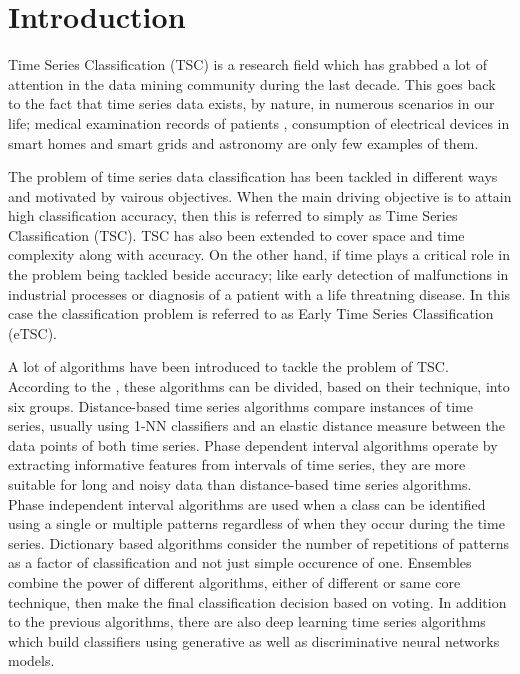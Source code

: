 \chapter{Introduction}
\label{ChapterIntroduction}
Time Series Classification (TSC) is a research field which has grabbed a lot of attention in the data mining community during the last decade.
This goes back to the fact that time series data exists, by nature, in numerous scenarios in our life; medical examination records of patients \cite{griffin2001toward,ghalwash2012early}, consumption of electrical devices in smart homes and smart grids \cite{gao2014plaid,10.1145/2611286.2611333} and astronomy \cite{protopapas2006finding,rakthanmanon2013fast} are only few examples of them.

The problem of time series data classification has been tackled in different ways and motivated by vairous objectives.
When the main driving objective is to attain high classification accuracy, then this is referred to simply as Time Series Classification (TSC).
TSC has also been extended to cover space and time complexity along with accuracy.
On the other hand, if time plays a critical role in the problem being tackled beside accuracy; like early detection of malfunctions in industrial processes or diagnosis of a patient with a life threatning disease.
In this case the classification problem is referred to as Early Time Series Classification (eTSC).

A lot of algorithms have been introduced to tackle the problem of TSC.
According to the \cite{bagnall2017great}, these algorithms can be divided, based on their technique, into six groups.
Distance-based time series algorithms compare instances of time series, usually using 1-NN classifiers and an elastic distance measure between the data points of both time series.
Phase dependent interval algorithms operate by extracting informative features from intervals of time series, they are more suitable for long and noisy data than distance-based time series algorithms.
Phase independent interval algorithms are used when a class can be identified using a single or multiple patterns regardless of when they occur during the time series.
Dictionary based algorithms consider the number of repetitions of patterns as a factor of classification and not just simple occurence of one.
Ensembles combine the power of different algorithms, either of different or same core technique, then make the final classification decision based on voting.
In addition to the previous algorithms, there are also deep learning time series algorithms which build classifiers using generative as well as discriminative neural networks models.

